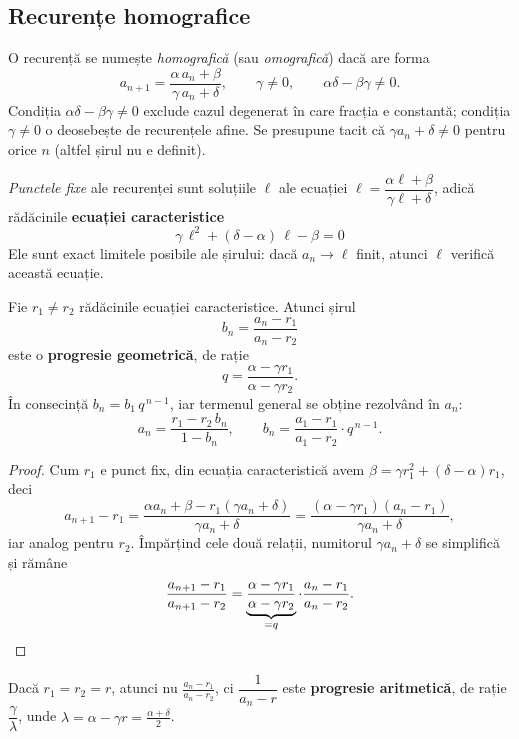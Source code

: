 \subsection{Recurențe homografice}

\begin{definitie}
O recurență se numește \emph{homografică} (sau \emph{omografică}) dacă are forma
\[
a_{n+1}=\frac{\alpha\,a_n+\beta}{\gamma\,a_n+\delta},\qquad \gamma\neq0,\qquad \alpha\delta-\beta\gamma\neq0 .
\]
Condiția $\alpha\delta-\beta\gamma\neq0$ exclude cazul degenerat în care fracția e constantă; condiția $\gamma\neq0$ o deosebește de recurențele afine. Se presupune tacit că $\gamma a_n+\delta\neq0$ pentru orice $n$ (altfel șirul nu e definit).
\end{definitie}

\begin{definitie}
\emph{Punctele fixe} ale recurenței sunt soluțiile $\ell$ ale ecuației $\ell=\dfrac{\alpha\ell+\beta}{\gamma\ell+\delta}$, adică rădăcinile \textbf{ecuației caracteristice}
\[
\boxed{\ \gamma\,\ell^{2}+(\delta-\alpha)\,\ell-\beta=0\ }
\]
Ele sunt exact limitele posibile ale șirului: dacă $a_n\to\ell$ finit, atunci $\ell$ verifică această ecuație.
\end{definitie}

\begin{teorema}
Fie $r_1\neq r_2$ rădăcinile ecuației caracteristice. Atunci șirul
\[
b_n=\frac{a_n-r_1}{a_n-r_2}
\]
este o \textbf{progresie geometrică}, de rație
\[
q=\frac{\alpha-\gamma r_1}{\alpha-\gamma r_2}.
\]
În consecință $b_n=b_1\,q^{\,n-1}$, iar termenul general se obține rezolvând în $a_n$:
\[
a_n=\frac{r_1-r_2\,b_n}{1-b_n},\qquad b_n=\frac{a_1-r_1}{a_1-r_2}\cdot q^{\,n-1}.
\]
\end{teorema}

\begin{proof}
Cum $r_1$ e punct fix, din ecuația caracteristică avem $\beta=\gamma r_1^2+(\delta-\alpha)r_1$, deci
\[
a_{n+1}-r_1=\frac{\alpha a_n+\beta-r_1(\gamma a_n+\delta)}{\gamma a_n+\delta}
=\frac{(\alpha-\gamma r_1)(a_n-r_1)}{\gamma a_n+\delta},
\]
iar analog pentru $r_2$. Împărțind cele două relații, numitorul $\gamma a_n+\delta$ se simplifică și rămâne
\[
\frac{a_{n+1}-r_1}{a_{n+1}-r_2}=\underbrace{\frac{\alpha-\gamma r_1}{\alpha-\gamma r_2}}_{=q}\cdot\frac{a_n-r_1}{a_n-r_2}. \qedhere
\]
\end{proof}

\begin{obs}
Dacă $r_1=r_2=r$, atunci nu $\frac{a_n-r_1}{a_n-r_2}$, ci $\dfrac{1}{a_n-r}$ este \textbf{progresie aritmetică}, de rație $\dfrac{\gamma}{\lambda}$, unde $\lambda=\alpha-\gamma r=\frac{\alpha+\delta}{2}$.
\end{obs}

